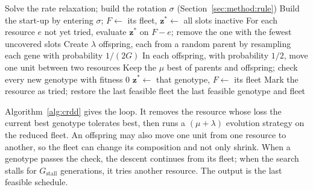\begin{algorithm}[t]
  \caption{C-RDD}
  \label{alg:crdd}
  \begin{algorithmic}[1]
    \State Solve the rate relaxation; build the rotation $\sigma$ (Section~\ref{sec:method:rule})
    \State Build the start-up by entering $\sigma$; $F \gets$ its fleet, $\mathbf{z}^\ast \gets$ all slots inactive
      \State For each resource $e$ not yet tried, evaluate $\mathbf{z}^\ast$ on $F - e$; remove the one with the fewest uncovered slots
      \Repeat
        \State Create $\lambda$ offspring, each from a random parent by resampling each gene with probability $1/(2G)$
        \State In each offspring, with probability $1/2$, move one unit between two resources
        \State Keep the $\mu$ best of parents and offspring; check every new genotype with fitness $0$
       \State $\mathbf{z}^\ast \gets$ that genotype, $F \gets$ its fleet
      \Else \State Mark the resource as tried; restore the last feasible fleet
      \EndIf
    \EndWhile
    \State \Return the last feasible genotype and fleet
  \end{algorithmic}
\end{algorithm}

Algorithm~\ref{alg:crdd} gives the loop.
It removes the resource whose loss the current best genotype tolerates best, then runs a $(\mu + \lambda)$ evolution strategy on the reduced fleet.
An offspring may also move one unit from one resource to another, so the fleet can change its composition and not only shrink.
When a genotype passes the check, the descent continues from its fleet; when the search stalls for $G_{\mathrm{stall}}$ generations, it tries another resource.
The output is the last feasible schedule.
